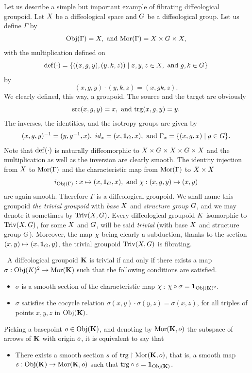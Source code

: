 \begin{article}
  \label{Trivial-fibrating-groupoid}
  Let us describe a simple but important example of fibrating diffeological groupoid.
  Let $X$ be a diffeological space and $G$ be a diffeological group.
  Let us define $\Gamma$ by
  $$%
  \Obj(\Gamma) = \X, \text{ and } \Mor(\Gamma) = \X \times \G \times \X,
  $$%
  with the multiplication defined on
  $$%
  \Def(\cdot) = \{((x,g,y), (y,k,z)) \mid x,y,z \in \X, \text{ and } g,k \in \G \}
  $$%
  by
  $$%
  (x,g,y) \cdot (y,k,z) = (x,gk,z).
  $$%
  We clearly defined,
  this way,
  a groupoid.
  The source and the target are obviously
  $$%
  \source(x,g,y) = x, \text{ and } \target(x,g,y) = y.
  $$%
  The inverses,
  the identities,
  and the isotropy groups are given by
  $$%
  (x,g,y)^{-1} = (y,g^{-1},x), \  id_x = (x,\id_\G, x), \text{ and } \Gamma_x = \{(x,g,x) \mid g \in \G\}.
  $$%
  Note that $\mathrm{def}(\cdot)$ is naturally diffeomorphic to $X \times G \times X \times G \times X$ and the multiplication as well as the inversion  are clearly smooth.
  The identity injection from $X$ to ${\operatorname{Mor}}(\Gamma)$ and the characteristic map from ${\operatorname{Mor}}(\Gamma)$ to $X \times X$
  $$%
  i_{\Obj(\Gamma)} : x \mapsto (x,\id_\G,x), \text{ and } \car : (x,g,y) \mapsto (x,y)
  $$%
  are again smooth.
  Therefore  $\Gamma$ is a diffeological groupoid.
  We shall name this groupoid  {\em the trivial groupoid} with {\em base $X$} and {\em structure group} $G$,
  and we may denote it sometimes by $\operatorname{Triv}(X,G)$.
  Every diffeological groupoid $K$ isomorphic to $\operatorname{Triv}(X,G)$,
  for some $X$ and $G$,
  will be said {\em trivial} (with base $X$ and structure group $G$).
  Moreover,
  the map $\chi$ being clearly a subduction,
  thanks to the section $(x,y) \mapsto (x,{\bf 1}_G,y)$,
  the trivial groupoid $\operatorname{Triv}(X,G)$ is fibrating.
  
  \Note~A diffeological groupoid ${\mathbf K}$ is trivial if and only if there exists a map $\sigma : {\operatorname{Obj}}(K)^2 \to {\operatorname{Mor}}({\mathbf K})$ such that the following conditions are satisfied.
  \begin{itemize}
    \item[A.] $\sigma$ is a smooth section of the characteristic map $\chi$\,:
    $\chi \circ \sigma = {\bf 1}_{{\operatorname{Obj}}({\mathbf K})^2}$.
    \item[B.] $\sigma$ satisfies the cocycle relation $\sigma(x,y) \cdot \sigma(y,z) = \sigma(x,z)$,
    for all triples of points $x,y,z$ in ${\operatorname{Obj}}({\mathbf K})$.
  \end{itemize}
  Picking a basepoint $o \in {\operatorname{Obj}}({\mathbf K})$,
  and denoting by ${\operatorname{Mor}}({\mathbf K},o)$ the subspace of arrows of ${\mathbf K}$ with origin $o$,
  it is equivalent to say that
  \begin{itemize}
    \item[A\textprime.] There exists a smooth section $s$ of ${\operatorname{trg}} \restriction {\operatorname{Mor}}({\mathbf K},o)$,
    that is,
    a smooth map $s : {\operatorname{Obj}}({\mathbf K}) \to {\operatorname{Mor}}({\mathbf K},o)$ such that ${\operatorname{trg}} \circ s = {\bf 1}_{{\operatorname{Obj}}({\mathbf K})}$.
  \end{itemize}
\end{article} %


